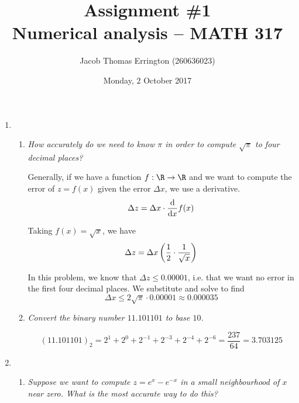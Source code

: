 \documentclass[11pt,letterpaper]{article}
\author{Jacob Thomas Errington (260636023)}
\title{Assignment \#1\\Numerical analysis -- MATH 317}
\date{Monday, 2 October 2017}
\begin{document}
\maketitle

\begin{enumerate}
  \item
    \begin{enumerate}
      \item
        \emph{How accurately do we need to know $\pi$ in order to compute
        $\sqrt{\pi}$ to four decimal places?}

        Generally, if we have a function $f : \R \to \R$ and we want to compute
        the error of $z = f(x)$ given the error $\Delta x$, we use a
        derivative.
        \begin{equation*}
          \Delta z = \Delta x \cdot \frac{\mathrm{d} }{\mathrm{d} x} f(x)
        \end{equation*}

        Taking $f(x) = \sqrt{x}$, we have
        \begin{equation*}
          \Delta z
          = \Delta x \left(\frac{1}{2} \cdot \frac{1}{\sqrt{x}}\right)
        \end{equation*}

        In this problem, we know that $\Delta z \leq 0.00001$, i.e. that we
        want no error in the first four decimal places.
        We substitute and solve to find
        \begin{equation*}
          \Delta x \leq 2 \sqrt{\pi} \cdot 0.00001 \approx 0.000035
        \end{equation*}

      \item
        \emph{Convert the binary number $11.101101$ to base $10$.}

        \begin{equation*}
          (11.101101)_2
          = 2^1 + 2^0 + 2^{-1} + 2^{-3} + 2^{-4} + 2^{-6}
          = \frac{237}{64}
          = 3.703125
        \end{equation*}
    \end{enumerate}

  \item
    \begin{enumerate}
      \item
        \emph{%
          Suppose we want to compute $z = e^x - e^{-x}$ in a small
          neighbourhood of $x$ near zero. What is the most accurate way to do
          this?%
        }


\end{enumerate}
\end{enumerate}
\end{document}
